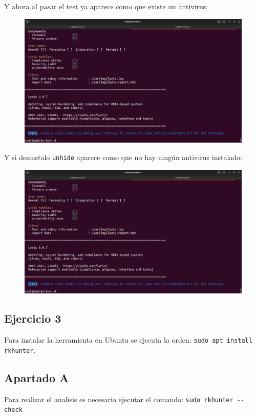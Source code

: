 \documentclass{article}
\begin{document}
Y ahora al pasar el test ya aparece como que existe un antivirus:

\begin{figure}[H]
    \includegraphics[width=\textwidth]{imagenes/lynisok.png}
\end{figure}

Y si desinstalo \verb|unhide| aparece como que no hay ningún antivirus instalado:

\begin{figure}[H]
    \includegraphics[width=\textwidth]{imagenes/lynisnook.png}
\end{figure}


\subsection*{Ejercicio 3}

Para instalar la herramienta en Ubuntu se ejecuta la orden: \verb|sudo apt install rkhunter|.

\subsection*{Apartado A}
Para realizar el analisis es necesario ejecutar el comando: \verb|sudo rkhunter --check|
\end{document}

